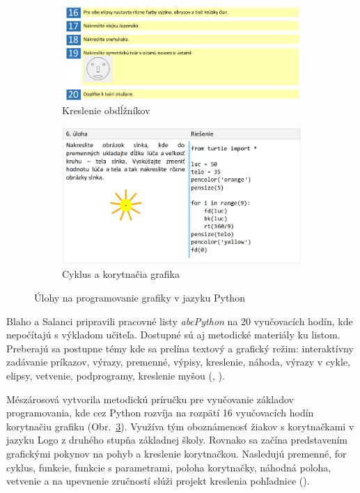 \begin{figure}[h]
\centering
\begin{subfigure}[b]{0.55\textwidth}
\centering
\includegraphics[width=\textwidth]{assets/kucera-python.png}
\caption{Kreslenie obdĺžníkov}
\label{fig:kucera-kreslenie-python}
\end{subfigure}
\hfill
\begin{subfigure}[b]{0.44\textwidth}
\centering
\includegraphics[width=\textwidth]{assets/uloha-turtle.png}
\caption{Cyklus a korytnačia grafika}
\label{fig:turtle-graphics}
\end{subfigure}
\caption{Úlohy na programovanie grafiky v jazyku Python}
\end{figure}

Blaho a Salanci pripravili pracovné listy \emph{abcPython} na 20 vyučovacích hodín, kde nepočítajú s výkladom učiteľa. Dostupné sú aj metodické materiály ku listom. Preberajú sa postupne témy kde sa prelína textový a grafický režim: interaktívny zadávanie príkazov, výrazy, premenné, výpisy, kreslenie, náhoda, výrazy v cykle, elipsy, vetvenie, podprogramy, kreslenie myšou (\cite{blaho_abcpython_2019}, \cite{blaho_metodiky_2019}). 

Mészárosová vytvorila metodickú príručku pre vyučovanie základov programovania, kde cez Python rozvíja na rozpätí 16 vyučovacích hodín korytnačiu grafiku (Obr.~\ref{fig:turtle-graphics}). Využíva tým oboznámenosť žiakov s korytnačkami v jazyku Logo z druhého stupňa základnej školy. Rovnako sa začína predstavením grafickými pokynov na pohyb a kreslenie korytnačkou. Nasledujú premenné, for cyklus, funkcie, funkcie s parametrami, poloha korytnačky, náhodná poloha, vetvenie a na upevnenie zručností slúži projekt kreslenia pohľadnice (\cite{meszarosova_python_2017}).

